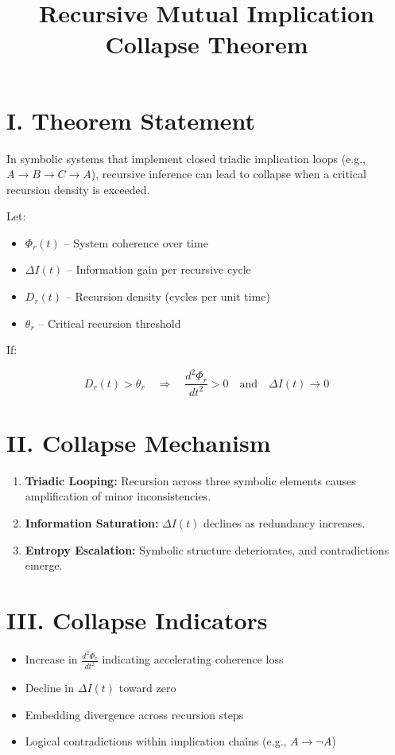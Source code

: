 \documentclass[12pt]{article}
\title{Recursive Mutual Implication Collapse Theorem}
\author{}
\date{}
\begin{document}
\maketitle

\section*{I. Theorem Statement}

In symbolic systems that implement closed triadic implication loops (e.g., $A \rightarrow B \rightarrow C \rightarrow A$), recursive inference can lead to collapse when a critical recursion density is exceeded.

Let:
\begin{itemize}
  \item $\Phi_r(t)$ – System coherence over time
  \item $\Delta I(t)$ – Information gain per recursive cycle
  \item $D_r(t)$ – Recursion density (cycles per unit time)
  \item $\theta_r$ – Critical recursion threshold
\end{itemize}

If:

\[
D_r(t) > \theta_r \quad \Rightarrow \quad \frac{d^2 \Phi_r}{dt^2} > 0 \quad \text{and} \quad \Delta I(t) \rightarrow 0
\]

\section*{II. Collapse Mechanism}

\begin{enumerate}
  \item \textbf{Triadic Looping:} Recursion across three symbolic elements causes amplification of minor inconsistencies.
  \item \textbf{Information Saturation:} $\Delta I(t)$ declines as redundancy increases.
  \item \textbf{Entropy Escalation:} Symbolic structure deteriorates, and contradictions emerge.
\end{enumerate}

\section*{III. Collapse Indicators}

\begin{itemize}
  \item Increase in $\frac{d^2 \Phi_r}{dt^2}$ indicating accelerating coherence loss
  \item Decline in $\Delta I(t)$ toward zero
  \item Embedding divergence across recursion steps
  \item Logical contradictions within implication chains (e.g., $A \rightarrow \neg A$)
\end{itemize}
\end{document}
